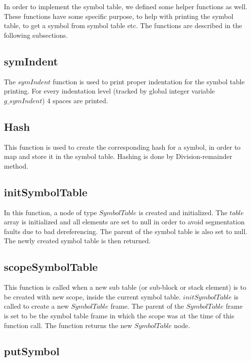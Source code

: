 \documentclass[preprint,12pt]{elsarticle}
\begin{document}
In order to implement the symbol table, we defined some helper functions as well. These functions have some specific purpose, to help with printing the symbol table, to get a symbol from symbol table etc. The functions are described in the following subsections.

\subsection{symIndent}

The $symIndent$ function is used to print proper indentation for the symbol table printing. For every indentation level (tracked by global integer variable $g\_symIndent$) 4 spaces are printed.

\subsection{Hash}

This function is used to create the corresponding hash for a symbol, in order to map and store it in the symbol table. Hashing is done by Division-remainder method.

\subsection{initSymbolTable}

In this function, a node of type $SymbolTable$ is created and initialized. The $table$ array is initialized and all elements are set to null in order to avoid segmentation faults due to bad dereferencing. The parent of the symbol table is also set to null. The newly created symbol table is then returned.

\subsection{scopeSymbolTable}

This function is called when a new sub table (or sub-block or stack element) is to be created with new scope, inside the current symbol table. $initSymbolTable$ is called to create a new $SymbolTable$ frame. The parent of the $SymbolTable$ frame is set to be the symbol table frame in which the scope was at the time of this function call. The function returns the new $SymbolTable$ node.

\subsection{putSymbol}
\end{document}
